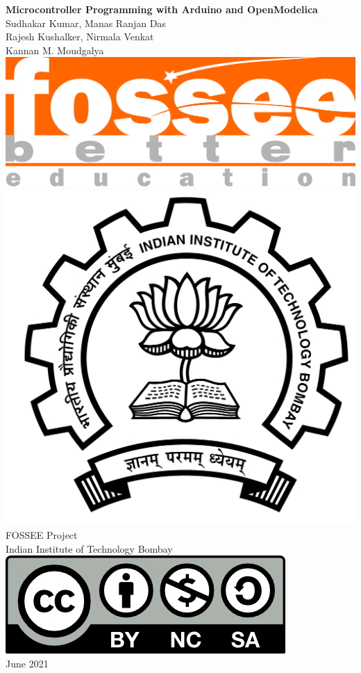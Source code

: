 \begin{center}
    {\bf {\Huge Microcontroller Programming with Arduino and OpenModelica}}
    \vfill
    Sudhakar Kumar, Manas Ranjan Das \\
    Rajesh Kushalker, Nirmala Venkat \\
    Kannan M. Moudgalya \\
    \vfill
    \includegraphics[width=0.3\linewidth]{suppl/fossee_logo_hi.png} \quad
    \includegraphics[width=0.2\linewidth]{suppl/IITB-logo-HighRes.png} \\
    FOSSEE Project \\
    Indian Institute of Technology Bombay \\ [2mm]
    \includegraphics[width=0.15\linewidth]{suppl/by-nc-sa.png} \\ [1mm]
    June 2021
\end{center}

\clearpage
